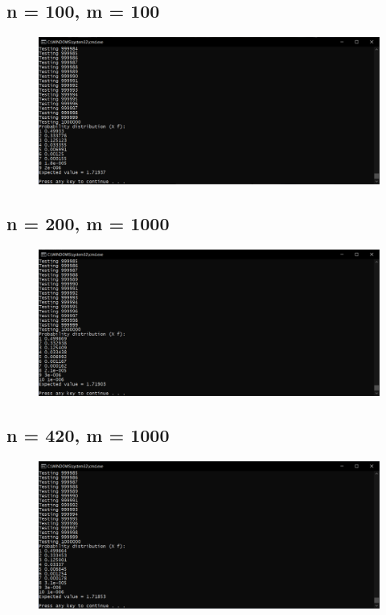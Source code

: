 \documentclass[12pt]{article}
\begin{document}
\subsection{n = 100, m = 100}
\begin{figure}[H]
\centering
\includegraphics[scale=0.5]{100-100-1000k.PNG}
\end{figure}
\subsection{n = 200, m = 1000}
\begin{figure}[H]
\centering
\includegraphics[scale=0.5]{200-1000-1000k.PNG}
\end{figure}
\subsection{n = 420, m = 1000}
\begin{figure}[H]
\centering
\includegraphics[scale=0.5]{420-1000-1000k.PNG}
\end{figure}
\end{document}
